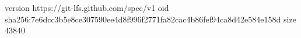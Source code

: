 version https://git-lfs.github.com/spec/v1
oid sha256:7e6dcc3b5e8ce307590ee4d8f996f2771fa82cac4b86fef94ca8d42e584e158d
size 43840
